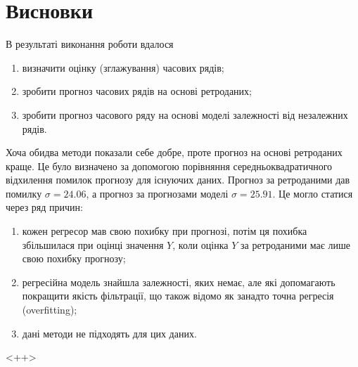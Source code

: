 \chapter*{Висновки}

В результаті виконання роботи вдалося
\begin{enumerate}
  \item визначити оцінку (зглажування) часових рядів;
  \item зробити прогноз часових рядів на основі ретроданих;
  \item зробити прогноз часового ряду на основі моделі залежності
    від незалежних рядів.
\end{enumerate}

Хоча обидва методи показали себе добре,
проте прогноз на основі ретроданих краще.
Це було визначено за допомогою порівняння середньоквадратичного відхилення
помилок прогнозу для існуючих даних.
Прогноз за ретроданими дав помилку $\sigma = 24.06$,
а прогноз за прогнозами моделі $\sigma = 25.91$.
Це могло статися через ряд причин:
\begin{enumerate}
  \item кожен регресор мав свою похибку при прогнозі,
    потім ця похибка збільшилася при оцінці значення $Y$,
    коли оцінка $Y$ за ретроданими має лише свою похибку прогнозу;
  \item регресійна модель знайшла залежності, яких немає,
    але які допомагають покращити якість фільтрації,
    що також відомо як занадто точна регресія (overfitting);
  \item дані методи не підходять для цих даних.
\end{enumerate}<++>

\begin{center}
\end{center}
